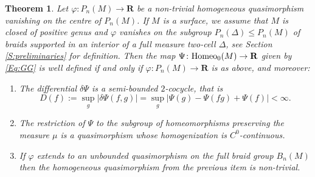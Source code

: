 \documentclass[11pt]{amsart}
\newtheorem{theorem}[subsection]{Theorem}%
\theoremstyle{definition}
\theoremstyle{remark}
\numberwithin{equation}{section}
\numberwithin{figure}{section}
\newcommand{\B}[1]{{\mathbf #1}}
\begin{document}
\begin{theorem}\label{T:main}
Let $\varphi\colon P_n(M)\to \B R$ be a non-trivial homogeneous
quasimorphism vanishing on the centre of $P_n(M)$. If $M$ is a surface,
we assume that $M$ is closed of positive genus and $\varphi$ vanishes on the subgroup
$P_n(\Delta)\leq P_n(M)$ of braids supported in an interior of a full measure two-cell $\Delta$, see
Section \ref{S:preliminaries} for definition. Then the 
map $\Psi \colon {\rm Homeo}_0(M)\to \B R$ given by \eqref{Eq:GG} 
is well defined if and only if $\varphi\colon P_n(M)\to \B R$ is as above, and moreover:

\begin{enumerate}
\item The differential $\delta\Psi$ is a semi-bounded $2$-cocycle, that is
$$
D(f):=\sup_{g} |\delta\Psi(f,g)| = \sup_g |\Psi(g) - \Psi(fg) + \Psi(f)| < \infty.
$$
\item
The restriction of $\Psi$ to the subgroup of homeomorphisms preserving the measure
$\mu$ is a quasimorphism whose homogenization is $C^0$-continuous.
\item 
If $\varphi$ extends to an unbounded quasimorphism on the full braid group $B_n(M)$ 
then the homogeneous quasimorphism from the previous item is non-trivial.
\end{enumerate}
\end{theorem}
\end{document}
